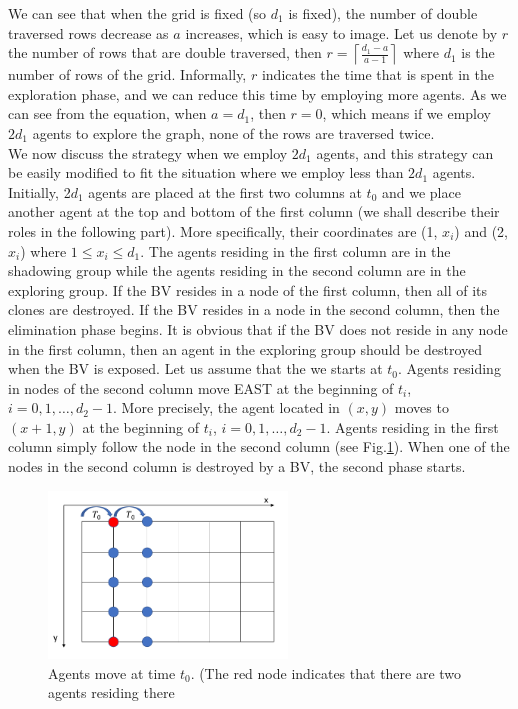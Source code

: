 We can see that when the grid is fixed (so $d_1$ is fixed), the number of double traversed rows decrease as $a$ increases, which is easy to image. Let us denote by $r$ the number of rows that are double traversed, then $r=\left \lceil \frac{d_1-a}{a-1} \right \rceil$ where $d_1$ is the number of rows of the grid. Informally, $r$ indicates the time that is spent   in the exploration phase, and we can reduce this time by employing more agents. As we can see from the equation, when $a=d_1$, then $r=0$, which means if we employ $2d_1$ agents to explore the graph, none of the rows are traversed twice. \\
We now discuss the strategy when we employ $2d_1$ agents, and this strategy can be easily modified to fit the situation where we employ less than $2d_1$ agents.\\
Initially, 2$d_1$ agents are placed at the first two columns at $t_0$ and we place another  agent at the top and bottom of the first column (we shall describe their roles in the following part). More specifically, their coordinates   are (1, $x_i$) and (2,$x_i$) where $1\leq x_i\leq d_1$. The agents residing in the first column are in the shadowing group while the agents residing in the second column are in the exploring group. If the BV resides in a node of the first column, then all of its clones are destroyed. If the BV resides in a node in the second column, then the elimination phase begins. It is obvious that if the BV does not reside in any node in the first column, then an agent in the exploring group should be destroyed when the BV is exposed.  Let us assume that the we starts at $t_0$. Agents residing in nodes of the second column move  EAST at the beginning of $t_i$, $i=0,1, \ldots ,d_2-1$. More precisely, the agent located in $(x, y)$ moves to $(x+1, y)$ at the beginning of $t_i$, $i=0,1, \dots , d_2-1$. Agents residing in the first column simply follow the node in the second column (see  Fig.\ref{fig:moving}). When one of the nodes in the second  column is destroyed by a BV, the second phase starts.
\begin{figure}[H]
  \centering  
  \includegraphics[width=2.5in]{figures/moving.png}
  \caption{Agents move at time $t_0$. (The red node indicates that there are two agents residing there}\label{fig:moving}
\end{figure}
